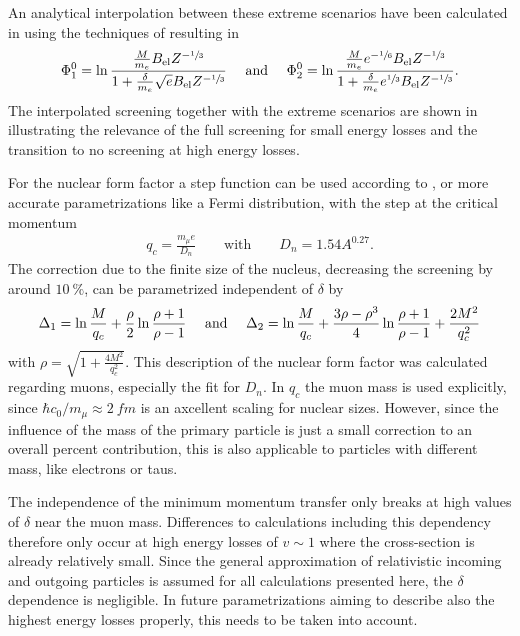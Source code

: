 An analytical interpolation between these extreme scenarios have been calculated in \cite{Sandrock18PhD} using the techniques of \cite{Petrukhin68} resulting in 
\begin{align} \label{eq:brems_screen_interpol}
    \Phi_1^0 =
        \operatorname{ln} \frac{\frac{M}{m_e} B_{\text{el}}Z^{-\sfrac13}}{1 + \frac{\delta}{m_e}\sqrt{e} B_{\text{el}} Z^{-\sfrac13}}
    \quad
    \text{ and }
    \quad
    \Phi_2^0 =
        \operatorname{ln} \frac{\frac{M}{m_e} e^{-\sfrac16} B_{\text{el}}Z^{-\sfrac13}}{1 + \frac{\delta}{m_e} e^{\sfrac13} B_{\text{el}} Z^{-\sfrac13}}.
\end{align}
The interpolated screening together with the extreme scenarios are shown in  illustrating the relevance of the full screening for small energy losses and the transition to no screening at high energy losses.

For the nuclear form factor a step function can be used according to \cite{Bugaev77}, or more accurate parametrizations like a Fermi distribution, with the step at the critical momentum \cite{Kelner95Brems}
\begin{align}
    q_c = \frac{m_{\mu}e}{D_n}
    \qquad \text{with} \qquad
    D_n = 1.54 A^{0.27} .
\end{align}
The correction due to the finite size of the nucleus, decreasing the screening by around $\SI{10}{\percent}$, can be parametrized independent of $\delta$ by \cite{Andreev94Brems}
\begin{align}
    \Delta_1 = \operatorname{ln} \frac{M}{q_c} + \frac{\rho}{2} \operatorname{ln} \frac{\rho + 1}{\rho - 1}
    \quad
    \text{ and }
    \quad
    \Delta_2 = \operatorname{ln} \frac{M}{q_c} + \frac{3\rho - \rho^3}{4} \operatorname{ln} \frac{\rho + 1}{\rho - 1} + \frac{2 M^2}{q_c^2}
\end{align}
with $\rho = \sqrt{1 + \frac{4M^2}{q_c^2}}$.
This description of the nuclear form factor was calculated regarding muons, especially the fit for $D_n$.
In $q_c$ the muon mass is used explicitly, since $\hbar c_0 / m_\mu \approx \SI{2}{fm}$ is an axcellent scaling for nuclear sizes.
However, since the influence of the mass of the primary particle is just a small correction to an overall percent contribution, this is also applicable to particles with different mass, like electrons or taus.

The independence of the minimum momentum transfer only breaks at high values of $\delta$ near the muon mass.
Differences to calculations including this dependency \cite{Kelner95Brems} therefore only occur at high energy losses of $v \sim 1$ where the cross-section is already relatively small.
Since the general approximation of relativistic incoming and outgoing particles is assumed for all calculations presented here, the $\delta$ dependence is negligible.
In future parametrizations aiming to describe also the highest energy losses properly, this needs to be taken into account.

